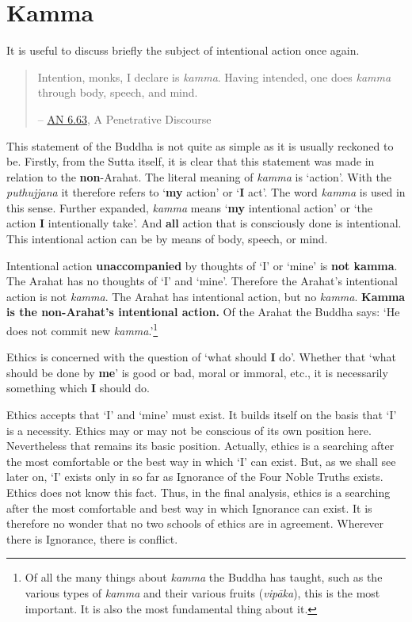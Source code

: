 \chapter{Kamma}

It is useful to discuss briefly the subject of intentional action once again.

\begin{quote}
Intention, monks, I declare is \emph{kamma}. Having intended, one does \emph{kamma} through body, speech, and mind.

 -- \href{https://suttacentral.net/an6.63/en/thanissaro}{AN 6.63}, A Penetrative Discourse
\end{quote}

This statement of the Buddha is not quite as simple as it is usually reckoned to be. Firstly, from the Sutta itself, it is clear that this statement was made in relation to the \textbf{non}-Arahat. The literal meaning of \emph{kamma} is `action'. With the \emph{puthujjana} it therefore refers to `\textbf{my} action' or `\textbf{I} act'. The word \emph{kamma} is used in this sense. Further expanded, \emph{kamma} means `\textbf{my} intentional action' or `the action \textbf{I} intentionally take'. And \textbf{all} action that is consciously done is intentional. This intentional action can be by means of body, speech, or mind.

Intentional action \textbf{unaccompanied} by thoughts of `I' or `mine' is \textbf{not kamma}. The Arahat has no thoughts of `I' and `mine'. Therefore the Arahat's intentional action is not \emph{kamma}. The Arahat has intentional action, but no \emph{kamma}. \textbf{Kamma is the non-Arahat's intentional action.} Of the Arahat the Buddha says: `He does not commit new \emph{kamma}.'\footnote{Of all the many things about \emph{kamma} the Buddha has taught, such as the various types of \emph{kamma} and their various fruits (\emph{vipāka}), this is the most important. It is also the most fundamental thing about it.}

Ethics is concerned with the question of `what should \textbf{I} do'. Whether that `what should be done by \textbf{me}' is good or bad, moral or immoral, etc., it is necessarily something which \textbf{I} should do.

Ethics accepts that `I' and `mine' must exist. It builds itself on the basis that `I' is a necessity. Ethics may or may not be conscious of its own position here. Nevertheless that remains its basic position. Actually, ethics is a searching after the most comfortable or the best way in which `I' can exist. But, as we shall see later on, `I' exists only in so far as Ignorance of the Four Noble Truths exists. Ethics does not know this fact. Thus, in the final analysis, ethics is a searching after the most comfortable and best way in which Ignorance can exist. It is therefore no wonder that no two schools of ethics are in agreement. Wherever there is Ignorance, there is conflict.


